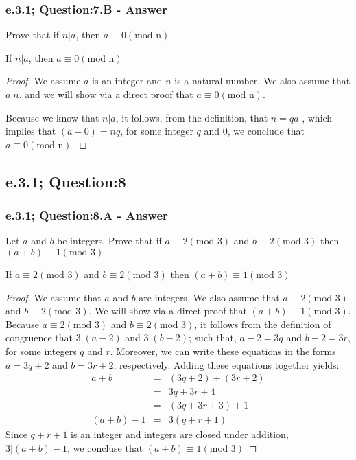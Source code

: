 \subsubsection*{e.3.1; Question:7.B - Answer}
Prove that if $n|a$, then $a \equiv 0 (\text{mod n})$

\begin{tcolorbox}
	\begin{theorem}
		If $n|a$, then $a \equiv 0 (\text{mod n})$
	\end{theorem}
\end{tcolorbox}

\begin{proof}
We assume $a$ is an integer and $n$ is a natural number. We also assume that $a|n$. and we will show via a direct proof  that $a \equiv 0 (\text{mod n})$. 


Because we know that $n|a$, it follows, from the definition, that   $n = qa$ , which implies that $(a - 0) = nq$, for some integer $q$ and $0$, we conclude that $a \equiv 0 (\text{mod n})$.
\end{proof}


\newpage
\subsection{e.3.1; Question:8}
\subsubsection*{e.3.1; Question:8.A - Answer}
Let $a$ and $b$ be integers. Prove that if $a \equiv 2 (\text{mod 3})$ and $b \equiv 2 (\text{mod 3})$ then $(a+b) \equiv 1 (\text{mod 3})$

\begin{tcolorbox}
	\begin{theorem}
		If $a \equiv 2 (\text{mod 3})$ and $b \equiv 2 (\text{mod 3})$ then $(a+b) \equiv 1 (\text{mod 3})$
	\end{theorem}
\end{tcolorbox}

\begin{proof}
We assume that $a$ and $b$ are integers. We also assume that $a \equiv 2 (\text{mod 3})$ and $b \equiv 2 (\text{mod 3})$. We will show via a direct proof that $(a+b) \equiv 1 (\text{mod 3})$. Because $a \equiv 2 (\text{mod 3})$ and $b \equiv 2 (\text{mod 3})$, it follows from the definition of congruence that $3|(a-2)$ and $3|(b-2)$; such that, $a-2 = 3q$ and $b-2 = 3r$, for some integers $q$ and $r$. Moreover, we can write these equations in the forms $a = 3q + 2$ and $b = 3r + 2$, respectively. 
Adding these equations together yields: 
	\begin{eqnarray}
		a + b & = & (3q + 2) + (3r + 2) \nonumber \\
		& = & 3q + 3r + 4 \nonumber \\
		& = & (3q + 3r + 3) + 1 \nonumber \\
		(a + b) - 1 & = & 3(q + r + 1) \nonumber
	\end{eqnarray}
Since $q + r + 1$ is an integer and integers are closed under addition, $3 | (a + b) - 1$, we concluse that 
$(a+b) \equiv 1 (\text{mod 3})$

\end{proof}


